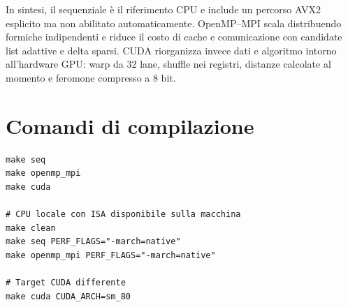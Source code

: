 \documentclass[11pt,a4paper]{article}
\begin{document}
In sintesi, il sequenziale è il riferimento CPU e include un percorso AVX2
esplicito ma non abilitato automaticamente. OpenMP--MPI scala distribuendo
formiche indipendenti e riduce il costo di cache e comunicazione con candidate
list adattive e delta sparsi. CUDA riorganizza invece dati e algoritmo intorno
all'hardware GPU: warp da 32 lane, shuffle nei registri, distanze calcolate al
momento e feromone compresso a 8 bit.

\section{Comandi di compilazione}
\begin{lstlisting}
make seq
make openmp_mpi
make cuda

# CPU locale con ISA disponibile sulla macchina
make clean
make seq PERF_FLAGS="-march=native"
make openmp_mpi PERF_FLAGS="-march=native"

# Target CUDA differente
make cuda CUDA_ARCH=sm_80
\end{lstlisting}
\end{document}
